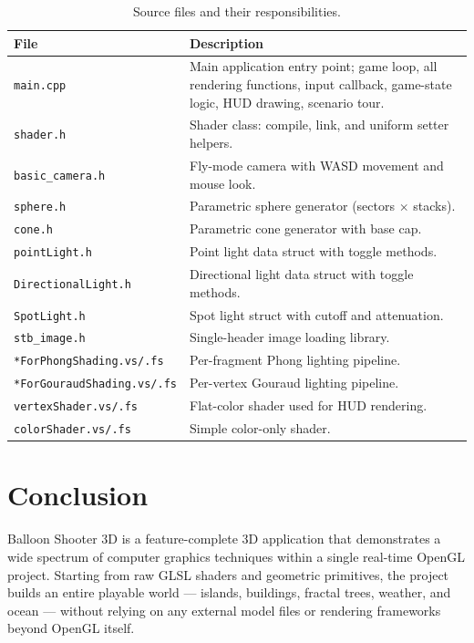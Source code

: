 \documentclass[12pt,a4paper]{article}
\begin{document}
\begin{table}[h!]
\centering
\begin{tabular}{@{} l p{9cm} @{}}
\toprule
\textbf{File} & \textbf{Description} \\
\midrule
\texttt{main.cpp}              & Main application entry point; game loop, all rendering functions, input callback, game-state logic, HUD drawing, scenario tour. \\
\texttt{shader.h}              & Shader class: compile, link, and uniform setter helpers. \\
\texttt{basic\_camera.h}       & Fly-mode camera with WASD movement and mouse look. \\
\texttt{sphere.h}              & Parametric sphere generator (sectors $\times$ stacks). \\
\texttt{cone.h}                & Parametric cone generator with base cap. \\
\texttt{pointLight.h}          & Point light data struct with toggle methods. \\
\texttt{DirectionalLight.h}    & Directional light data struct with toggle methods. \\
\texttt{SpotLight.h}           & Spot light struct with cutoff and attenuation. \\
\texttt{stb\_image.h}          & Single-header image loading library. \\
\midrule
\texttt{*ForPhongShading.vs/.fs}   & Per-fragment Phong lighting pipeline. \\
\texttt{*ForGouraudShading.vs/.fs} & Per-vertex Gouraud lighting pipeline. \\
\texttt{vertexShader.vs/.fs}       & Flat-color shader used for HUD rendering. \\
\texttt{colorShader.vs/.fs}        & Simple color-only shader. \\
\bottomrule
\end{tabular}
\caption{Source files and their responsibilities.}
\end{table}

\newpage
\section{Conclusion}

Balloon Shooter 3D is a feature-complete 3D application that demonstrates a wide spectrum of computer graphics techniques within a single real-time OpenGL project. Starting from raw GLSL shaders and geometric primitives, the project builds an entire playable world --- islands, buildings, fractal trees, weather, and ocean --- without relying on any external model files or rendering frameworks beyond OpenGL itself.
\end{document}
